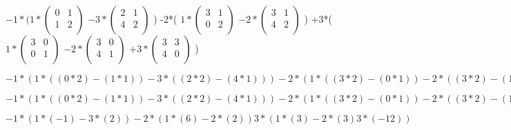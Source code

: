 $
-1*(
  1*
  \begin{pmatrix}
    0 & 1 \\
    1 & 2 \\
  \end{pmatrix}
  $
  $
  -3*
  \begin{pmatrix}
    2 & 1 \\
    4 & 2 \\
  \end{pmatrix}
  $
)
-2*(
  $
  1*
  \begin{pmatrix}
    3 & 1 \\
    0 & 2 \\
  \end{pmatrix}
  $
  $
  -2*
  \begin{pmatrix}
    3 & 1 \\
    4 & 2 \\
  \end{pmatrix}
  $
)
+3*(
  $
  1*
  \begin{pmatrix}
    3 & 0 \\
    0 & 1 \\
  \end{pmatrix}
  $
  $
  -2*
  \begin{pmatrix}
    3 & 0 \\
    4 & 1 \\
  \end{pmatrix}
  $
  $
  +3*
  \begin{pmatrix}
    3 & 3 \\
    4 & 0 \\
  \end{pmatrix}
  $
)

\vspace{5mm} %

$
-1*(
  1*((0*2) - (1*1) )
  -3*((2*2) - (4*1))
)
-2*(
  1*((3*2)-(0*1))
  -2*((3*2)-(1*4))
)
3*(
  1*((3*1)-(0*0))
  -2*((3*1)-(4*0))
  3*((3*0)-(3*4))
)
$

\vspace{5mm} %

$
-1*(
  1*((0*2) - (1*1) )
  -3*((2*2) - (4*1))
)
-2*(
  1*((3*2)-(0*1))
  -2*((3*2)-(1*4))
)
3*(
  1*((3*1)-(0*0))
  -2*((3*1)-(4*0))
  3*((3*0)-(3*4))
)
$

\vspace{5mm} %

$
-1*(
  1*(-1)
  -3*(2)
)
-2*(
  1*(6)
  -2*(2)
)
3*(
  1*(3)
  -2*(3)
  3*(-12)
)
$

\vspace{5mm} %

